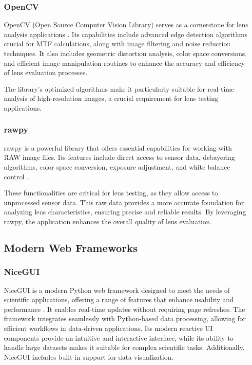 \subsubsection{OpenCV}
OpenCV (Open Source Computer Vision Library) serves as a cornerstone for lens analysis applications \cite{opencv}. Its capabilities include advanced edge detection algorithms crucial for MTF calculations, along with image filtering and noise reduction techniques. It also includes geometric distortion analysis, color space conversions, and efficient image manipulation routines to enhance the accuracy and efficiency of lens evaluation processes.

The library's optimized algorithms make it particularly suitable for real-time analysis of high-resolution images, a crucial requirement for lens testing applications.

\subsubsection{rawpy}
rawpy is a powerful library that offers essential capabilities for working with RAW image files. Its features include direct access to sensor data, debayering algorithms, color space conversion, exposure adjustment, and white balance control \cite{rawpy}.

These functionalities are critical for lens testing, as they allow access to unprocessed sensor data. This raw data provides a more accurate foundation for analyzing lens characteristics, ensuring precise and reliable results. By leveraging rawpy, the application enhances the overall quality of lens evaluation.

\subsection{Modern Web Frameworks}
\subsubsection{NiceGUI}
NiceGUI is a modern Python web framework designed to meet the needs of scientific applications, offering a range of features that enhance usability and performance \cite{nicegui}. It enables real-time updates without requiring page refreshes. The framework integrates seamlessly with Python-based data processing, allowing for efficient workflows in data-driven applications. Its modern reactive UI components provide an intuitive and interactive interface, while its ability to handle large datasets makes it suitable for complex scientific tasks. Additionally, NiceGUI includes built-in support for data visualization.

